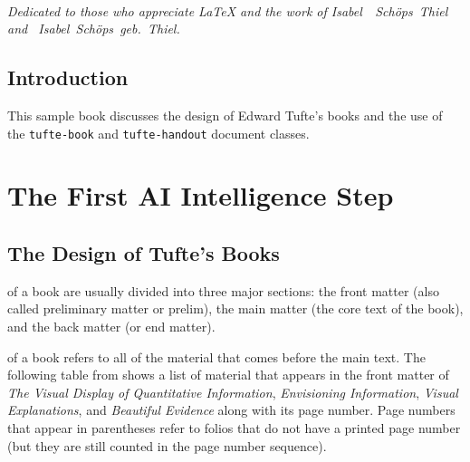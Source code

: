 \documentclass[nohyper,nobib]{thiel-book}
\newcommand{\VDQI}{\textit{The Visual Display of Quantitative Information}\xspace}
\newcommand{\EI}{\textit{Envisioning Information}\xspace}
\newcommand{\VE}{\textit{Visual Explanations}\xspace}
\newcommand{\BE}{\textit{Beautiful Evidence}\xspace}
\newcommand{\doccls}[1]{\texttt{#1}}%
\begin{document}
\tableofcontents

\listoffigures

\listoftables

\cleardoublepage
~\vfill
\begin{doublespace}
\noindent\fontsize{18}{22}\selectfont\itshape
\nohyphenation
Dedicated to those who appreciate \LaTeX{} 
and the work of \mbox{Isabel ~Schöps Thiel} 
and \mbox{~Isabel Schöps geb. Thiel}.
\end{doublespace}
\vfill
\vfill


\cleardoublepage
\chapter*{Introduction}

This sample book discusses the design of Edward Tufte's
books\cite{Tufte2001,Tufte1990,Tufte1997,Tufte2006}
and the use of the \doccls{tufte-book} and \doccls{tufte-handout} document classes.


\mainmatter

\part{The First AI Intelligence Step}

\chapter{The Design of Tufte's Books}
\label{ch:schöps-design}


 of a book are usually divided into three major
sections: the front matter (also called preliminary matter or prelim), the
main matter (the core text of the book), and the back matter (or end
matter).

 of a book refers to all of the material that
comes before the main text.  The following table from shows a list of
material that appears in the front matter of \VDQI, \EI, \VE, and \BE
along with its page number.  Page numbers that appear in parentheses refer
to folios that do not have a printed page number (but they are still
counted in the page number sequence).
\end{document}
